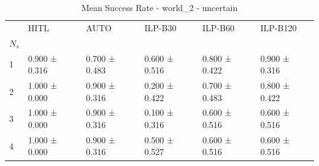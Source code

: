 \begin{table}
\caption{Mean Success Rate - world_2 - uncertain}
\label{tab:success_rate_uncertain}
\begin{tabular}{llllll}
\toprule
 & HITL & AUTO & ILP-B30 & ILP-B60 & ILP-B120 \\
$N_s$ &  &  &  &  &  \\
\midrule
1 & 0.900 ± 0.316 & 0.700 ± 0.483 & 0.600 ± 0.516 & 0.800 ± 0.422 & 0.900 ± 0.316 \\
2 & 1.000 ± 0.000 & 0.900 ± 0.316 & 0.200 ± 0.422 & 0.700 ± 0.483 & 0.800 ± 0.422 \\
3 & 1.000 ± 0.000 & 0.900 ± 0.316 & 0.100 ± 0.316 & 0.600 ± 0.516 & 0.600 ± 0.516 \\
4 & 1.000 ± 0.000 & 0.900 ± 0.316 & 0.500 ± 0.527 & 0.600 ± 0.516 & 0.600 ± 0.516 \\
\bottomrule
\end{tabular}
\end{table}
